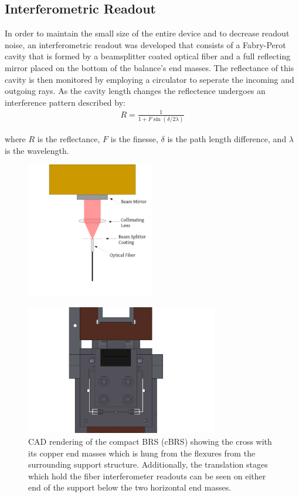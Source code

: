 \documentclass [12pt, proquest]{uwthesis}[2019]
\begin{document}
\subsection{Interferometric Readout}
In order to maintain the small size of the entire device and to decrease readout noise, an interferometric readout was developed that consists of a Fabry-Perot cavity that is formed by a beamsplitter coated optical fiber and a full reflecting mirror placed on the bottom of the balance's end masses. The reflectance of this cavity is then monitored by employing a circulator to seperate the incoming and outgoing rays. As the cavity length changes the reflectence undergoes an interference pattern described by:
\begin{align}
R=\frac{1}{1+F \sin(\delta/2 \lambda)}
\end{align}

where $R$ is the reflectance, $F$ is the finesse, $\delta$ is the path length difference, and $\lambda$ is the wavelength.

\begin{figure}[!h]
\begin{center}
\includegraphics[width=0.5\textwidth]{FiberInt.pdf}
\end{center}
\caption{}
\end{figure}

\begin{figure}[!h]
\begin{center}
\includegraphics[width=0.75\textwidth]{cBRSOptics.png}
\end{center}
\caption{CAD rendering of the compact BRS (cBRS) showing the cross with its copper end masses which is hung from the flexures from the surrounding support structure. Additionally, the translation stages which hold the fiber interferometer readouts can be seen on either end of the support below the two horizontal end masses.}
\end{figure}
\end{document}
